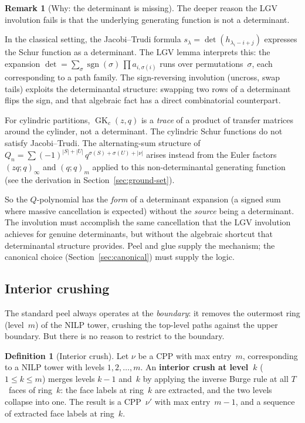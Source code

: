 \documentclass[11pt]{article}
\newcommand{\GK}{\operatorname{GK}}
\newcommand{\qpoch}[2]{(#1;#2)_\infty}
\newcommand{\qpochn}[3]{(#1;#2)_{#3}}
\theoremstyle{plain}
\theoremstyle{definition}
\newtheorem{definition}[theorem]{Definition}
\newtheorem{remark}[theorem]{Remark}
\begin{document}
\begin{remark}[Why: the determinant is missing]
\label{rmk:determinant}
The deeper reason the LGV involution fails is that the underlying
generating function is not a determinant.

In the classical setting, the Jacobi--Trudi formula
$s_\lambda = \det(h_{\lambda_i - i + j})$
expresses the Schur function as a determinant.  The LGV lemma
interprets this: the expansion
$\det = \sum_\sigma \operatorname{sgn}(\sigma)\,\prod a_{i,\sigma(i)}$
runs over permutations~$\sigma$, each corresponding to a path
family.  The sign-reversing involution (uncross, swap tails)
exploits the determinantal structure: swapping two rows of a
determinant flips the sign, and that algebraic fact has a direct
combinatorial counterpart.

For cylindric partitions, $\GK_c(z,q)$ is a \emph{trace} of a
product of transfer matrices around the cylinder, not a
determinant.  The cylindric Schur functions do not satisfy
Jacobi--Trudi.  The alternating-sum structure of
$Q_n = \sum (-1)^{|S|+|U|}\, q^{\sigma(S)+\sigma(U)+|\nu|}$
arises instead from the Euler factors $\qpoch{zq}{q}$ and
$\qpochn{q}{q}{m}$ applied to this non-determinantal generating
function (see the derivation in Section~\ref{sec:ground-set}).

So the $Q$-polynomial has the \emph{form} of a determinant
expansion (a signed sum where massive cancellation is expected)
without the \emph{source} being a determinant.  The involution
must accomplish the same cancellation that the LGV involution
achieves for genuine determinants, but without the algebraic
shortcut that determinantal structure provides.  Peel and glue
supply the mechanism; the canonical choice
(Section~\ref{sec:canonical}) must supply the logic.
\end{remark}


\subsection{Interior crushing}
\label{sec:crushing}

The standard peel always operates at the \emph{boundary}: it
removes the outermost ring (level~$m$) of the NILP tower,
crushing the top-level paths against the upper boundary.  But
there is no reason to restrict to the boundary.

\begin{definition}[Interior crush]
\label{def:crush}
Let $\nu$ be a CPP with max entry~$m$, corresponding to a NILP
tower with levels $1, 2, \ldots, m$.  An \textbf{interior crush
at level~$k$} ($1 \leq k \leq m$) merges levels $k-1$ and~$k$
by applying the inverse Burge rule at all $T$~faces of ring~$k$:
the face labels at ring~$k$ are extracted, and the two levels
collapse into one.  The result is a CPP~$\nu'$ with max
entry~$m-1$, and a sequence of extracted face labels at ring~$k$.
\end{definition}
\end{document}
